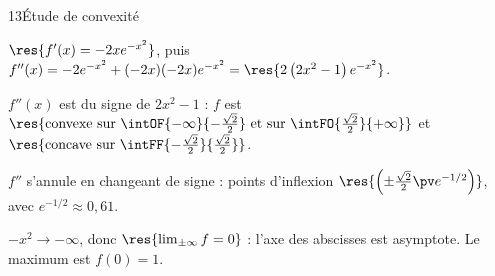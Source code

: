 \begin{corrige}{13}{Étude de convexité}
\noindent
\begin{minipage}[t]{0.54\linewidth}\vspace{0pt}\raggedright
\begin{questions}
  \item $\res{f'(x)=-2xe^{-x^{2}}}$, puis $f''(x)=-2e^{-x^{2}}+(-2x)(-2x)e^{-x^{2}}=\res{2\left(2x^{2}-1\right)e^{-x^{2}}}$.
  \item $f''(x)$ est du signe de $2x^{2}-1$ : $f$ est $\res{\text{convexe sur }\intOF{-\infty}{-\frac{\sqrt2}{2}}\text{ et sur }\intFO{\frac{\sqrt2}{2}}{+\infty}}$
    et $\res{\text{concave sur }\intFF{-\frac{\sqrt2}{2}}{\frac{\sqrt2}{2}}}$.
  \item $f''$ s'annule en changeant de signe : points d'inflexion $\res{\left(\pm\frac{\sqrt2}{2}\pv e^{-1/2}\right)}$, avec $e^{-1/2}\approx0{,}61$.
  \item $-x^{2}\to-\infty$, donc $\res{\lim_{\pm\infty}f=0}$ : l'axe des abscisses est asymptote. Le maximum est $f(0)=1$.
\end{questions}
\end{minipage}\hfill
\begin{minipage}[t]{0.42\linewidth}\vspace{1mm}
\centering
{}\\[0.5mm]
\end{minipage}
\end{corrige}

